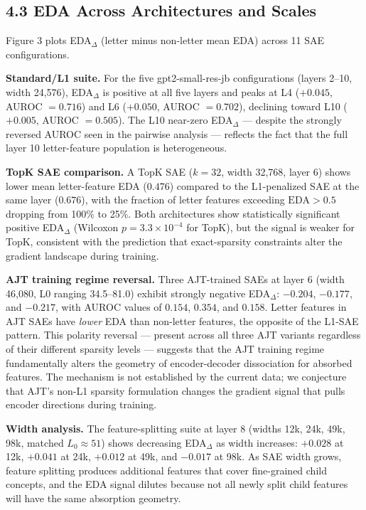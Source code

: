 \documentclass{article}
\begin{document}
\subsection{4.3 EDA Across Architectures and Scales}

Figure 3 plots EDA$_\Delta$ (letter minus non-letter mean EDA) across 11 SAE configurations.

\textbf{Standard/L1 suite.} For the five gpt2-small-res-jb configurations (layers 2–10, width 24,576),
EDA$_\Delta$ is positive at all five layers and peaks at L4 ($+0.045$, AUROC $= 0.716$) and L6
($+0.050$, AUROC $= 0.702$), declining toward L10 ($+0.005$, AUROC $= 0.505$).
The L10 near-zero EDA$_\Delta$ — despite the strongly reversed AUROC seen in the pairwise analysis
— reflects the fact that the full layer 10 letter-feature population is heterogeneous.

\textbf{TopK SAE comparison.} A TopK SAE ($k = 32$, width 32,768, layer 6) shows lower mean letter-feature
EDA ($0.476$) compared to the L1-penalized SAE at the same layer ($0.676$), with the fraction of
letter features exceeding $\text{EDA} > 0.5$ dropping from 100\% to 25\%.
Both architectures show statistically significant positive EDA$_\Delta$ (Wilcoxon $p = 3.3 \times 10^{-4}$
for TopK), but the signal is weaker for TopK, consistent with the prediction that exact-sparsity
constraints alter the gradient landscape during training.

\textbf{AJT training regime reversal.} Three AJT-trained SAEs at layer 6 (width 46,080, L0 ranging
34.5–81.0) exhibit strongly negative EDA$_\Delta$: $-0.204$, $-0.177$, and $-0.217$,
with AUROC values of $0.154$, $0.354$, and $0.158$.
Letter features in AJT SAEs have \textit{lower} EDA than non-letter features, the opposite of the L1-SAE
pattern.
This polarity reversal — present across all three AJT variants regardless of their different
sparsity levels — suggests that the AJT training regime fundamentally alters the geometry of
encoder-decoder dissociation for absorbed features.
The mechanism is not established by the current data; we conjecture that AJT's non-L1 sparsity
formulation changes the gradient signal that pulls encoder directions during training.

\textbf{Width analysis.} The feature-splitting suite at layer 8 (widths 12k, 24k, 49k, 98k,
matched $L_0 \approx 51$) shows decreasing EDA$_\Delta$ as width increases:
$+0.028$ at 12k, $+0.041$ at 24k, $+0.012$ at 49k, and $-0.017$ at 98k.
As SAE width grows, feature splitting produces additional features that cover fine-grained
child concepts, and the EDA signal dilutes because not all newly split child features will have
the same absorption geometry.
\end{document}
